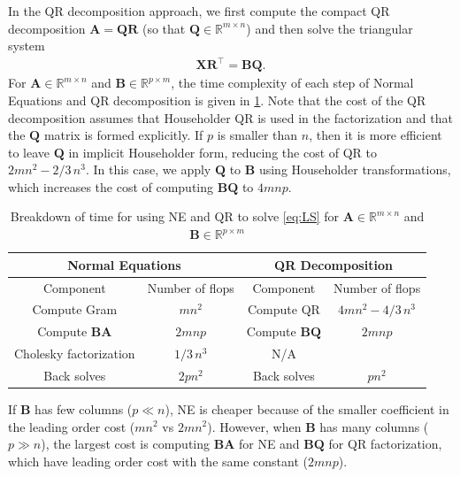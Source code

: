 \documentclass{article}
\newcommand{\mat}[1]{\mathbf{#1}}
\begin{document}
In the QR decomposition approach, we first compute the compact QR decomposition $\mat{A} = \mat{Q}\mat{R}$ (so that $\mat{Q}\in \mathbb{R}^{m \times n}$) and then solve the  triangular system
\begin{align}
\label{eq:QR}  
\mat{X} \mat{R}^\top = \mat{B}\mat{Q}.
\end{align}
For $\mat{A} \in \mathbb{R}^{m \times n}$ and $\mat{B} \in \mathbb{R}^{p \times m}$, the time complexity of each step of Normal Equations and QR decomposition is given in \cref{tab:QR-NE-time}.
Note that the cost of the QR decomposition assumes that Householder QR is used in the factorization and that the $\mat{Q}$ matrix is formed explicitly.
If $p$ is smaller than $n$, then it is more efficient to leave $\mat{Q}$ in implicit Householder form, reducing the cost of QR to $2mn^2-2/3 \,n^3$.
In this case, we apply $\mat{Q}$ to $\mat{B}$ using Householder transformations, which increases the cost of computing $\mat{B}\mat{Q}$ to $4mnp$. 


\begin{table}[!ht]
  \centering
  \begin{tabular}{|c|c|c|c|}
    \hline
    \multicolumn{2}{|c|}{\textbf{Normal Equations}} & \multicolumn{2}{c|}{\textbf{QR Decomposition}} \\
    \hline
    Component & Number of flops & Component & Number of flops\\
    \hline
    Compute Gram & $mn^2$ & Compute QR & $4mn^2 - 4/3 \, n^3$\\
    Compute $\mat{B}\mat{A}$ & $2mnp$ & Compute $\mat{B}\mat{Q}$ & $2mnp$\\
    Cholesky factorization & $1/3 \, n^3$  & N/A & \\
    Back solves & $2pn^2$  & Back solves & $pn^2$  \\
    \hline
  \end{tabular}
  \caption{Breakdown of time for using NE and QR to solve \cref{eq:LS} for $\mat{A} \in \mathbb{R}^{m \times n}$ and $\mat{B} \in \mathbb{R}^{p \times m}$}
  \label{tab:QR-NE-time}
\end{table}


If $\mat{B}$ has few columns ($p\ll n$), NE is cheaper because of the smaller coefficient in the leading order cost ($mn^2$ vs $2mn^2$). 
However, when $\mat{B}$ has many columns ($p\gg n$), the largest cost is computing $\mat{B}\mat{A}$ for NE and $\mat{B}\mat{Q}$ for QR factorization, which have leading order cost with the same constant ($2mnp$).
\end{document}
